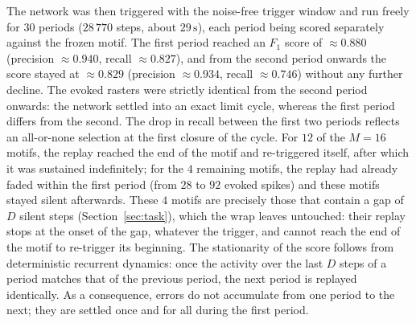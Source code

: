 \documentclass{scrartcl}
\begin{document}
The network was then triggered with the noise-free trigger window and run freely for $30$ periods ($28\,770$ steps, about $29\,\mathrm{s}$), each period being scored separately against the frozen motif. The first period reached an $F_1$ score of $\approx 0.880$ (precision $\approx 0.940$, recall $\approx 0.827$), and from the second period onwards the score stayed at $\approx 0.829$ (precision $\approx 0.934$, recall $\approx 0.746$) without any further decline. The evoked rasters were strictly identical from the second period onwards: the network settled into an exact limit cycle, whereas the first period differs from the second. The drop in recall between the first two periods reflects an all-or-none selection at the first closure of the cycle. For $12$ of the $M = 16$ motifs, the replay reached the end of the motif and re-triggered itself, after which it was sustained indefinitely; for the $4$ remaining motifs, the replay had already faded within the first period (from $28$ to $92$ evoked spikes) and these motifs stayed silent afterwards. These $4$ motifs are precisely those that contain a gap of $D$ silent steps (Section~\ref{sec:task}), which the wrap leaves untouched: their replay stops at the onset of the gap, whatever the trigger, and cannot reach the end of the motif to re-trigger its beginning. The stationarity of the score follows from deterministic recurrent dynamics: once the activity over the last $D$ steps of a period matches that of the previous period, the next period is replayed identically. As a consequence, errors do not accumulate from one period to the next; they are settled once and for all during the first period.
\end{document}
